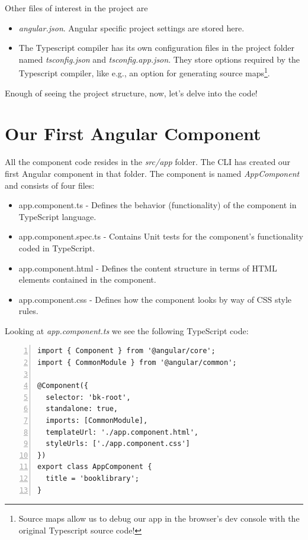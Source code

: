 \documentclass[10pt]{•}\documentclass{report}
\begin{document}
Other files of interest in the project are
\begin{itemize}
	\item \textsl{angular.json}. Angular specific project settings are stored here.
	\item The Typescript compiler has its own configuration files in the project folder named \textsl{tsconfig.json} and \textsl{tsconfig.app.json}. They store options required by the Typescript compiler, like e.g., an option for generating source maps\footnote{Source maps allow us to debug our app in the browser's dev console with the original Typescript source code!}.
\end{itemize}

Enough of seeing the project structure, now, let's delve into the code!

\section{Our First Angular Component}
All the component code resides in the \textsl{src/app} folder. The CLI has created our first Angular component in that folder. The component is named \textsl{AppComponent} and consists of four files:

\begin{itemize}
	\item app.component.ts - Defines the behavior (functionality) of the component in TypeScript language.
	\item app.component.spec.ts - Contains Unit tests for the component's functionality coded in TypeScript.
	\item app.component.html - Defines the content structure in terms of HTML elements contained in the component.
	\item app.component.css - Defines how the component looks by way of CSS style rules.
\end{itemize}

Looking at \textsl{app.component.ts} we see the following TypeScript code:
\begin{Verbatim}[numbers=left]
import { Component } from '@angular/core';
import { CommonModule } from '@angular/common';

@Component({
  selector: 'bk-root',
  standalone: true,
  imports: [CommonModule],
  templateUrl: './app.component.html',
  styleUrls: ['./app.component.css']
})
export class AppComponent {
  title = 'booklibrary';
}
\end{Verbatim}
\end{document}
